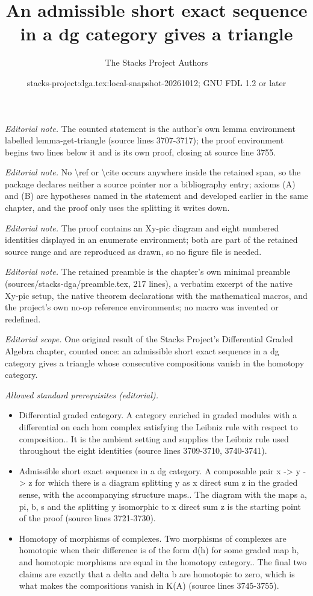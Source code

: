 \documentclass{stacks-project}
\title{An admissible short exact sequence in a dg category gives a triangle}
\author{The Stacks Project Authors}
\date{stacks-project:dga.tex:local-snapshot-20261012; GNU FDL 1.2 or later}
\theoremstyle{plain}
\theoremstyle{definition}
\theoremstyle{remark}
\numberwithin{equation}{subsection}
\begin{document}
\maketitle
\noindent\textit{Editorial note.} The counted statement is the author's own lemma environment labelled lemma-get-triangle (source lines 3707-3717); the proof environment begins two lines below it and is its own proof, closing at source line 3755.\par\medskip
\noindent\textit{Editorial note.} No \textbackslash{}ref or \textbackslash{}cite occurs anywhere inside the retained span, so the package declares neither a source pointer nor a bibliography entry; axioms (A) and (B) are hypotheses named in the statement and developed earlier in the same chapter, and the proof only uses the splitting it writes down.\par\medskip
\noindent\textit{Editorial note.} The proof contains an Xy-pic diagram and eight numbered identities displayed in an enumerate environment; both are part of the retained source range and are reproduced as drawn, so no figure file is needed.\par\medskip
\noindent\textit{Editorial note.} The retained preamble is the chapter's own minimal preamble (sources/stacks-dga/preamble.tex, 217 lines), a verbatim excerpt of the native Xy-pic setup, the native theorem declarations with the mathematical macros, and the project's own no-op reference environments; no macro was invented or redefined.\par\medskip
\noindent\textit{Editorial scope.} One original result of the Stacks Project's Differential Graded Algebra chapter, counted once: an admissible short exact sequence in a dg category gives a triangle whose consecutive compositions vanish in the homotopy category.\par\medskip
\noindent\textit{Allowed standard prerequisites (editorial).}\begin{itemize}
\item Differential graded category. A category enriched in graded modules with a differential on each hom complex satisfying the Leibniz rule with respect to composition.. It is the ambient setting and supplies the Leibniz rule used throughout the eight identities (source lines 3709-3710, 3740-3741).
\item Admissible short exact sequence in a dg category. A composable pair x -> y -> z for which there is a diagram splitting y as x direct sum z in the graded sense, with the accompanying structure maps.. The diagram with the maps a, pi, b, s and the splitting y isomorphic to x direct sum z is the starting point of the proof (source lines 3721-3730).
\item Homotopy of morphisms of complexes. Two morphisms of complexes are homotopic when their difference is of the form d(h) for some graded map h, and homotopic morphisms are equal in the homotopy category.. The final two claims are exactly that a delta and delta b are homotopic to zero, which is what makes the compositions vanish in K(A) (source lines 3745-3755).
\end{itemize}\medskip
\end{document}
